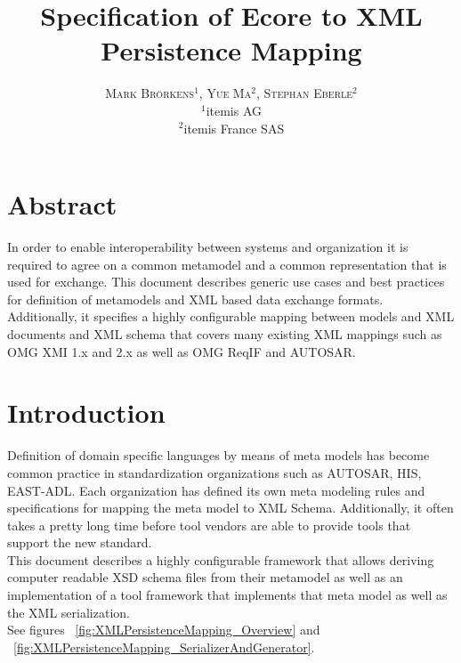 \documentclass[11pt,a4paper]{article}
\title{Specification of Ecore to XML Persistence Mapping}
\author{%
	\large
	\textsc{Mark Br\"orkens$^1$, Yue Ma$^2$, Stephan Eberle$^2$} \\[2mm]
	\normalsize	$^1$itemis AG \\
	\normalsize       $^2$itemis France SAS
	}
\begin{document}
\maketitle

\tableofcontents

\section{Abstract}
In order to enable interoperability between systems and organization it is required to agree on a common metamodel and a common representation that is used for exchange. This document describes  generic use cases and best practices for definition of metamodels and XML based data exchange formats. Additionally, it specifies a highly configurable mapping between models and XML documents and XML schema that covers many existing XML mappings such as OMG XMI 1.x and 2.x as well as OMG ReqIF and AUTOSAR.  

\section{Introduction}
Definition of domain specific languages by means of meta models has become common practice in standardization organizations such as AUTOSAR, HIS, EAST-ADL. Each organization has defined its own meta modeling rules and specifications for mapping the meta model to XML Schema. Additionally, it often takes a pretty long time before tool vendors are able to provide tools that support the new standard.\\

This document describes a highly configurable framework that allows deriving computer readable XSD schema files from their metamodel as well as an implementation of a tool framework that implements that meta model as well as the XML serialization.\\

See figures ~\ref{fig:XMLPersistenceMapping_Overview} and ~\ref{fig:XMLPersistenceMapping_SerializerAndGenerator}.
\end{document}
